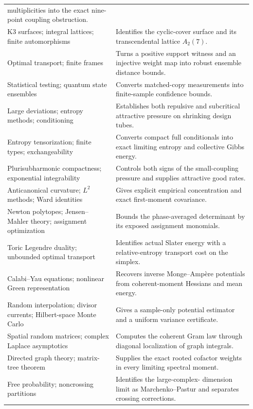 {\begin{longtable}{@{}p{.29\linewidth}p{.66\linewidth}@{}}
multiplicities into the exact nine-point coupling obstruction.\\
K3 surfaces; integral lattices; finite automorphisms & Identifies the
cyclic-cover surface and its transcendental lattice $A_2(7)$.\\
Optimal transport; finite frames & Turns a positive support witness
and an injective weight map into robust ensemble distance bounds.\\
Statistical testing; quantum state ensembles & Converts matched-copy
measurements into finite-sample confidence bounds.\\
Large deviations; entropy methods; conditioning & Establishes both
repulsive and subcritical attractive pressure on shrinking design tubes.\\
Entropy tensorization; finite types; exchangeability & Converts compact
full conditionals into exact limiting entropy and collective Gibbs energy.\\
Plurisubharmonic compactness; exponential integrability & Controls both
signs of the small-coupling pressure and supplies attractive good rates.\\
Anticanonical curvature; $L^2$ methods; Ward identities & Gives explicit
empirical concentration and exact first-moment covariance.\\
Newton polytopes; Jensen--Mahler theory; assignment optimization & Bounds
the phase-averaged determinant by its exposed assignment monomials.\\
Toric Legendre duality; unbounded optimal transport & Identifies actual
Slater energy with a relative-entropy transport cost on the simplex.\\
Calabi--Yau equations; nonlinear Green representation & Recovers inverse
Monge--Amp\`ere potentials from coherent-moment Hessians and mean energy.\\
Random interpolation; divisor currents; Hilbert-space Monte Carlo &
Gives a sample-only potential estimator and a uniform variance certificate.\\
Spatial random matrices; complex Laplace asymptotics & Computes the
coherent Gram law through diagonal localization of graph integrals.\\
Directed graph theory; matrix-tree theorem & Supplies the exact rooted
cofactor weights in every limiting spectral moment.\\
Free probability; noncrossing partitions & Identifies the large-complex-
dimension limit as Marchenko--Pastur and separates crossing corrections.\\

\end{longtable}}
